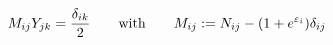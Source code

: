 \begin{equation}
M_{ij}Y_{jk}=\frac{\delta _{ik}}{2}\quad \quad {\rm  with}\qquad 
M_{ij}:=N_{ij}-(1+e^{\varepsilon _{i}})\delta _{ij}  \label{M}
\end{equation}%
